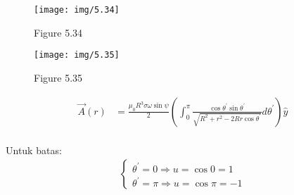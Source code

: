 \begin{figure}[h]
    \centering
    \begin{minipage}{.5\textwidth}
        \centering
        \texttt{[image: img/5.34]}
        \caption*{Figure 5.34}
        \label{fig:5.34}
    \end{minipage}%
    \begin{minipage}{.5\textwidth}
        \centering
        \texttt{[image: img/5.35]}
        \caption*{Figure 5.35}
        \label{fig:5.35}
    \end{minipage}
\end{figure}

 \begin{minipage}{.7\textwidth}
        \centering
        \begin{align*}
            \vec{A}(r) &=\frac{\mu_0 R^3 \sigma \omega \sin \psi}{2}\left(\int_0^\pi \frac{\cos \theta^{\prime} \sin \theta^{\prime}}{\sqrt{R^2+r^2-2 R r \cos \theta^{\prime}}} d \theta^{\prime}\right) \hat{{y}}\\
        \end{align*}
    \end{minipage}%
    \vline 
    \small
    \begin{minipage}{.3\textwidth}
        \hspace{0.1in}
        {Untuk batas:}
        \fontsize{10pt}{12pt}\selectfont
        \begin{gather*}
            \begin{cases}
                \theta^{\prime}=0 \Rightarrow u =\cos 0 = 1\\
                \theta^{\prime}=\pi \Rightarrow u =\cos \pi = -1
            \end{cases}
        \end{gather*}
    \end{minipage}